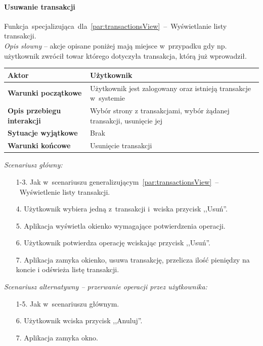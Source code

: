\paragraph{Usuwanie transakcji\newline}
\label{par:transactionDelete}
Funkcja~specjalizująca~dla~\ref{par:transactionsView}~--~Wyświetlanie listy transakcji.\\

\textit{Opis słowny} -- akcje opisane poniżej mają miejsce w~przypadku gdy np. użytkownik zwrócił towar którego dotyczyła transakcja, którą już wprowadził.

\begin{longtable}{|p{5cm}|p{7cm}|}
  \hline \textbf{Aktor} & Użytkownik \\
  \hline \textbf{Warunki początkowe} & Użytkownik jest zalogowany oraz istnieją transakcje w~systemie \\
  \hline \textbf{Opis przebiegu interakcji} & Wybór strony z transakcjami, wybór żądanej transakcji, usunięcie jej \\
  \hline \textbf{Sytuacje wyjątkowe} & Brak \\
  \hline \textbf{Warunki końcowe} & Usunięcie transakcji \\
  \hline
\end{longtable}

\noindent \textit{Scenariusz główny:}
\begin{enumerate}
  \item[1-3.] Jak w~scenariuszu generalizującym~\ref{par:transactionsView}~--~Wyświetlenie listy transakcji.
  \item[4.] Użytkownik wybiera jedną z~transakcji i~wciska przycisk ,,Usuń''.
  \item[5.] Aplikacja wyświetla okienko wymagające potwierdzenia operacji.
  \item[6.] Użytkownik potwierdza operację wciskając przycisk ,,Usuń''.
  \item[7.] Aplikacja zamyka okienko, usuwa transakcję, przelicza ilość pieniędzy na koncie i odświeża listę transakcji.
\end{enumerate}

\noindent \textit{Scenariusz alternatywny -- przerwanie operacji przez użytkownika:}
\begin{enumerate}
  \item[1-5.] Jak w~scenariuszu głównym.
  \item[6.] Użytkownik wciska przycisk ,,Anuluj''.
  \item[7.] Aplikacja zamyka okno.
\end{enumerate}

